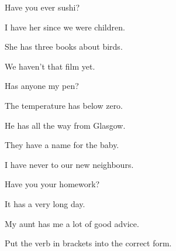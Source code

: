 \documentclass[11pt]{article}
\begin{document}

\begin{gapexercise}
  \item Have you ever  sushi?
  \item I have  her since we were children.
  \item She has  three books about birds.
  \item We haven't  that film yet.
  \item Has anyone  my pen?
  \item The temperature has  below zero.
  \item He has  all the way from Glasgow.
  \item They have  a name for the baby.
  \item I have never  to our new neighbours.
  \item Have you  your homework?
  \item It has  a very long day.
  \item My aunt has  me a lot of good advice.
\end{gapexercise}

%
  {Put the verb in brackets into the correct form.}
\end{document}
